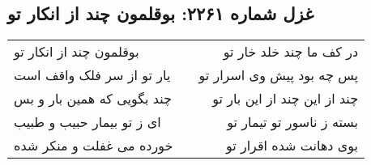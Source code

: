 \begin{center}
\section*{غزل شماره ۲۲۶۱: بوقلمون چند از انکار تو}
\label{sec:2261}
\begin{longtable}{l p{0.5cm} r}
بوقلمون چند از انکار تو
&&
در کف ما چند خلد خار تو
\\
یار تو از سر فلک واقف است
&&
پس چه بود پیش وی اسرار تو
\\
چند بگویی که همین بار و بس
&&
چند از این چند از این بار تو
\\
ای ز تو بیمار حبیب و طبیب
&&
بسته ز ناسور تو تیمار تو
\\
خورده می غفلت و منکر شده
&&
بوی دهانت شده اقرار تو
\\
\end{longtable}
\end{center}
